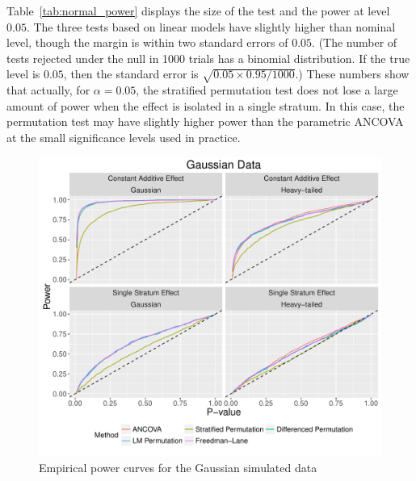 \documentclass[12pt]{article}
\begin{document}
Table~\ref{tab:normal_power} displays the size of the test and the power at level $0.05$.
The three tests based on linear models have slightly higher than nominal level, though the margin is within two standard errors of $0.05$.
(The number of tests rejected under the null in 1000 trials has a binomial distribution.
If the true level is $0.05$, then the standard error is $\sqrt{0.05 \times 0.95/1000}$.)
These numbers show that actually, for $\alpha=0.05$, the stratified permutation test does not lose a large amount of power when the effect is isolated in a single stratum.
In this case, the permutation test may have slightly higher power than the parametric ANCOVA at the small significance levels used in practice.
\begin{figure}[h]
\centering
\includegraphics[width = \textwidth]{fig/normal_simulation_power.pdf}
\caption{Empirical power curves for the Gaussian simulated data}
\label{fig:normal_sim_power}
\end{figure}
\begin{center}

\end{center}
\end{document}
